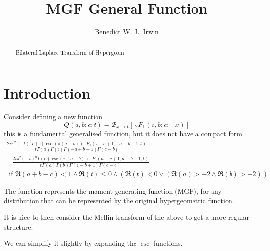 \documentclass[journal=jcisd8,manuscript=article,layout=onecolumn,pdftex,floatfix,amsmath,amssymb,10pt]{achemso}
\title{MGF General Function}
\author{Benedict W. J.~Irwin}
\affiliation{Cambridge, United Kingdom}
\begin{document}
\begin{abstract}
Bilateral Laplace Transform of Hypergeom
\end{abstract}

\section{Introduction}
Consider defining a new function 
$$
Q(a,b;c;t) = \mathcal{B}_{x\to t}\left[\;_2F_1(a,b;c;-x)\right]
$$
this is a fundamental generalised function, but it does not have a compact form
\begin{align}
\frac{2 i \pi ^2 (-t)^b \Gamma (c) \csc (\pi  (a-b)) \, _1F_1(b-c+1;-a+b+1;t)}{t \Gamma (a) \Gamma (b) \Gamma (-a+b+1) \Gamma (c-b)} \\ - \frac{2 i \pi ^2 (-t)^a \Gamma (c) \csc (\pi  (a-b)) \,
    _1F_1(a-c+1;a-b+1;t)}{t \Gamma (a) \Gamma (b) \Gamma (a-b+1) \Gamma (c-a)} 
\\ \text{ if }\Re(a+b-c)<1\land \Re(t)\leq 0\land (\Re(t)<0\lor (\Re(a)>-2\land \Re(b)>-2))
\end{align}
    
The function represents the moment generating function (MGF), for any distribution that can be represented by the original hypergeometric function.

It is nice to then consider the Mellin transform of the above to get a more regular structure.


We can simplify it slightly by expanding the $\csc$ functions.
\end{document}
